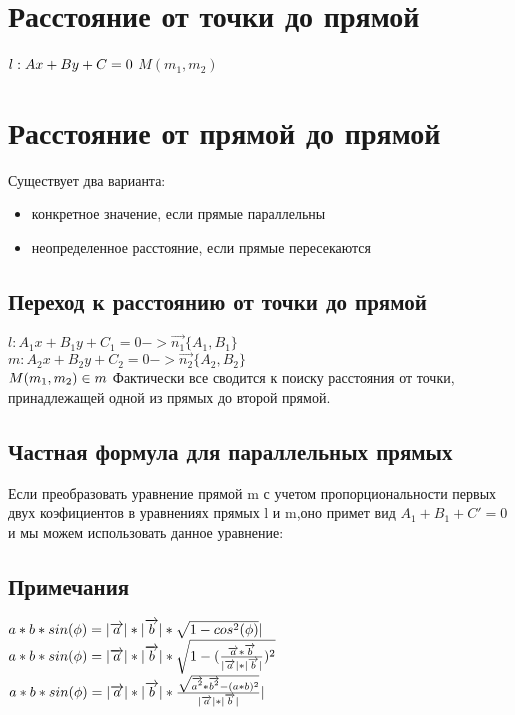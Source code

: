 \documentclass{book}
\begin{document}
\section{Расстояние от точки до прямой}
$l: Ax+By+C=0\\$
$M(m_1,m_2)$
\section{Расстояние от прямой до прямой}
Существует два варианта:
\begin{itemize}
    \item конкретное значение, если прямые параллельны
    \item неопределенное расстояние, если прямые пересекаются
\end{itemize}
\subsection{Переход к расстоянию от точки до прямой}
$l: A_1x+B_1y+C_1=0 -> \overrightarrow{n_1}\{A_1,B_1\}$\\
$m: A_2x+B_2y+C_2=0 -> \overrightarrow{n_2}\{A_2,B_2\}$\\
$M(m_1,m_2) \in m\\$
Фактически все сводится к поиску расстояния от точки, принадлежащей одной из прямых до второй прямой.
\subsection{Частная формула для параллельных прямых}
Если преобразовать уравнение прямой m с учетом пропорциональности первых двух коэфициентов в уравнениях прямых l и m,оно примет вид $A_1+B_1+C'=0$ и мы можем использовать данное уравнение:\\
\subsection{Примечания}
$a*b*sin(\phi)=|\overrightarrow{a}|*|\overrightarrow{b}|*\sqrt{1-cos^2(\phi)}|\\$
$a*b*sin(\phi)=|\overrightarrow{a}|*|\overrightarrow{b}|*\sqrt{1-(\frac{\overrightarrow{a}*\overrightarrow{b}}{|\overrightarrow{a}|*|\overrightarrow{b}|})^2}\\$
$a*b*sin(\phi)=|\overrightarrow{a}|*|\overrightarrow{b}|*\frac{\sqrt{\overrightarrow{a^2}*\overrightarrow{b^2}-(a*b)^2}}{|\overrightarrow{a}|*|\overrightarrow{b}|}|\\$
\newpage
\end{document}
